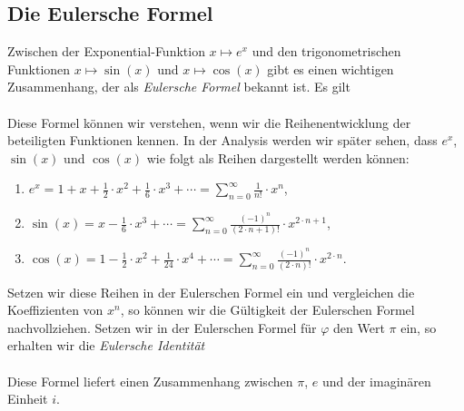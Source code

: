 \subsection{Die Eulersche Formel}
Zwischen der Exponential-Funktion $x \mapsto e^x$ und den trigonometrischen Funktionen 
$x \mapsto \sin(x)$ und $x \mapsto \cos(x)$ gibt es einen wichtigen Zusammenhang, der als
\emph{Eulersche Formel} bekannt ist.  Es gilt
\\[0.2cm]
\hspace*{1.3cm}
\\[0.2cm]
Diese Formel k\"{o}nnen wir verstehen, wenn wir die Reihenentwicklung der beteiligten Funktionen kennen.
In der Analysis werden wir sp\"{a}ter sehen, dass $e^x$, $\sin(x)$ und $\cos(x)$ wie folgt als Reihen
dargestellt werden k\"{o}nnen:
\begin{enumerate}
\item $\displaystyle e^x = 1 + x + \frac{1}{2} \cdot x^2 + \frac{1}{6} \cdot x^3 + \cdots = \sum\limits_{n=0}^\infty \frac{1}{n!} \cdot x^n$,
\item $\displaystyle \sin(x) = x - \frac{1}{6} \cdot x^3 + \cdots = \sum\limits_{n=0}^\infty \frac{(-1)^{n}}{(2 \cdot n + 1)!} \cdot x^{2 \cdot n + 1}$,
\item $\displaystyle \cos(x) = 1 -  \frac{1}{2} \cdot x^2 +  \frac{1}{24} \cdot x^4 + \cdots = \sum\limits_{n=0}^\infty  \frac{(-1)^{n}}{(2 \cdot n)!} \cdot x^{2 \cdot n}$.
\end{enumerate}
Setzen wir diese Reihen in der Eulerschen Formel ein und vergleichen die Koeffizienten von $x^n$, so
k\"{o}nnen wir die G\"{u}ltigkeit der Eulerschen Formel nachvollziehen.  Setzen wir in der Eulerschen Formel
f\"{u}r $\varphi$ den Wert $\pi$ ein, so erhalten wir die \emph{Eulersche Identit\"{a}t}
\\[0.2cm]
\hspace*{1.3cm}
\\[0.2cm]
Diese Formel liefert einen Zusammenhang zwischen $\pi$, $e$ und der imagin\"{a}ren Einheit $i$.


